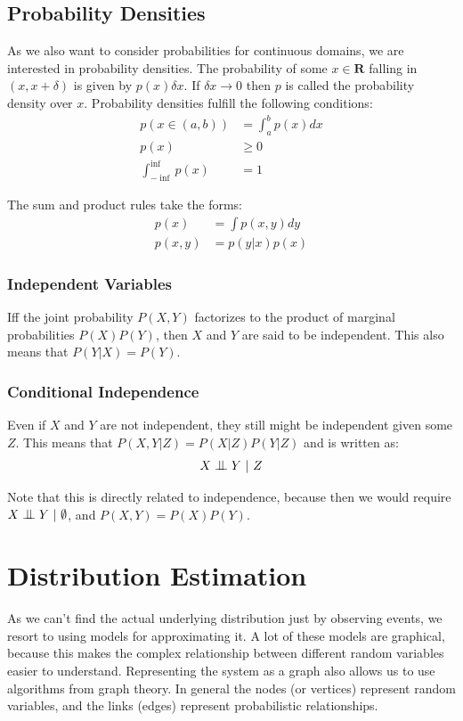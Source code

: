 \documentclass{article}
\newcommand{\bigCI}{\mathrel{\text{\scalebox{1.07}{$\perp\mkern-10mu\perp$}}}}
\begin{document}
\subsection{Probability Densities}
As we also want to consider probabilities for continuous domains, we are interested in probability densities.
The probability of some $x \in \mathbf{R}$ falling in $(x, x+\delta)$ is given by $p(x)\delta x$.
If $\delta x \rightarrow 0$ then $p$ is called the probability density over $x$.
Probability densities fulfill the following conditions:
\begin{align}
	p(x \in (a,b)) &= \int_a^b p(x) dx\\
	p(x) &\ge 0\\
	\int_{- \inf}^{\inf} p(x) &= 1
\end{align}

The sum and product rules take the forms:
\begin{align}
	p(x) &= \int p(x,y) dy\\
	p(x, y) &= p(y|x) p(x)
\end{align}

\subsubsection{Independent Variables}
Iff the joint probability $P(X,Y)$ factorizes to the product of marginal probabilities $P(X)P(Y)$, then $X$ and $Y$ are said to be independent.
This also means that $P(Y|X) = P(Y)$.

\subsubsection{Conditional Independence}
Even if $X$ and $Y$ are not independent, they still might be independent given some $Z$.
This means that $P(X,Y | Z) = P(X|Z) P(Y|Z)$ and is written as:
\begin{equation}
	X \bigCI Y \ |\ Z
\end{equation}

Note that this is directly related to independence, because then we would require $X \bigCI Y\ |\ \emptyset$, and $P(X,Y) = P(X)P(Y)$.

\section{Distribution Estimation}
As we can't find the actual underlying distribution just by observing events, we resort to using models for approximating it.
A lot of these models are graphical, because this makes the complex relationship between different random variables easier to understand.
Representing the system as a graph also allows us to use algorithms from graph theory.
In general the nodes (or vertices) represent random variables, and the links (edges) represent probabilistic relationships.
\end{document}
